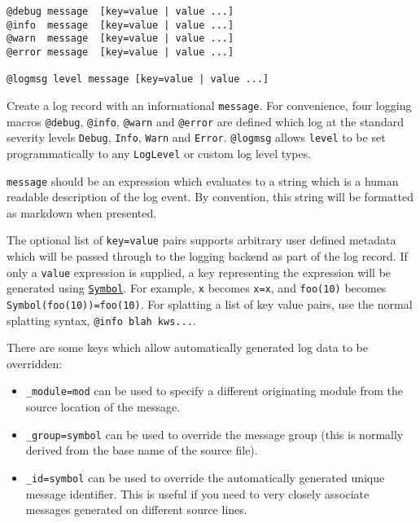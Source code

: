 \begin{adjustwidth}{2em}{0pt}


\begin{verbatim}
@debug message  [key=value | value ...]
@info  message  [key=value | value ...]
@warn  message  [key=value | value ...]
@error message  [key=value | value ...]

@logmsg level message [key=value | value ...]
\end{verbatim}

Create a log record with an informational \texttt{message}.  For convenience, four logging macros \texttt{@debug}, \texttt{@info}, \texttt{@warn} and \texttt{@error} are defined which log at the standard severity levels \texttt{Debug}, \texttt{Info}, \texttt{Warn} and \texttt{Error}.  \texttt{@logmsg} allows \texttt{level} to be set programmatically to any \texttt{LogLevel} or custom log level types.

\texttt{message} should be an expression which evaluates to a string which is a human readable description of the log event.  By convention, this string will be formatted as markdown when presented.

The optional list of \texttt{key=value} pairs supports arbitrary user defined metadata which will be passed through to the logging backend as part of the log record.  If only a \texttt{value} expression is supplied, a key representing the expression will be generated using \hyperlink{18332791376992528422}{\texttt{Symbol}}. For example, \texttt{x} becomes \texttt{x=x}, and \texttt{foo(10)} becomes \texttt{Symbol({\textquotedbl}foo(10){\textquotedbl})=foo(10)}.  For splatting a list of key value pairs, use the normal splatting syntax, \texttt{@info {\textquotedbl}blah{\textquotedbl} kws...}.

There are some keys which allow automatically generated log data to be overridden:

\begin{itemize}
\item \texttt{\_module=mod} can be used to specify a different originating module from the source location of the message.


\item \texttt{\_group=symbol} can be used to override the message group (this is normally derived from the base name of the source file).


\item \texttt{\_id=symbol} can be used to override the automatically generated unique message identifier.  This is useful if you need to very closely associate messages generated on different source lines.



\end{itemize}
\end{adjustwidth}
